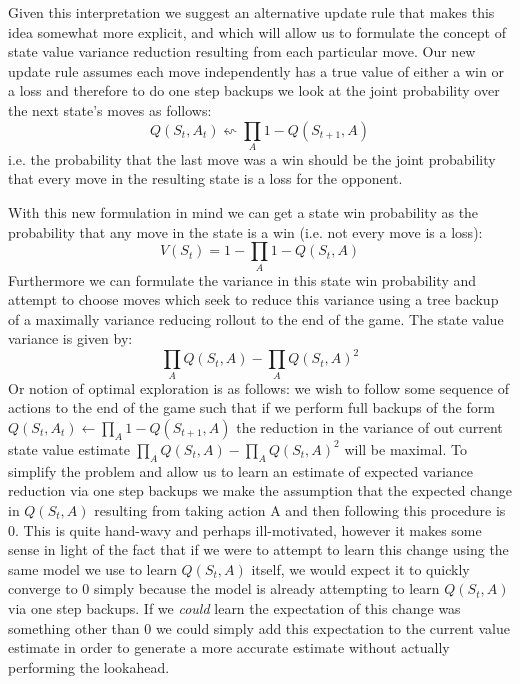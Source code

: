 \documentclass{article}
\begin{document}
Given this interpretation we suggest an alternative update rule that makes this idea somewhat more explicit, and which will allow us to formulate the concept of state value variance reduction resulting from each particular move. Our new update rule assumes each move independently has a true value of either a win or a loss and therefore to do one step backups we look at the joint probability over the next state's moves as follows:
$$Q(S_t,A_t)\leftsquigarrow \prod_A 1-Q(S_{t+1},A)$$
i.e. the probability that the last move was a win should be the joint probability that every move in the resulting state is a loss for the opponent.

With this new formulation in mind we can get a state win probability as the probability that any move in the state is a win (i.e. not every move is a loss):
$$V(S_t)=1-\prod_A 1-Q(S_t,A)$$
Furthermore we can formulate the variance in this state win probability and attempt to choose moves which seek to reduce this variance using a tree backup of a maximally variance reducing rollout to the end of the game. The state value variance is given by:
$$\prod_A Q(S_t,A)-\prod_A Q(S_t,A)^2$$
Or notion of optimal exploration is as follows: we wish to follow some sequence of actions to the end of the game such that if we perform full backups of the form $Q(S_t,A_t)\leftarrow \prod_A 1-Q(S_{t+1},A)$ the reduction in the variance of out current state value estimate $\prod_A Q(S_t,A)-\prod_A Q(S_t,A)^2$ will be maximal. To simplify the problem and allow us to learn an estimate of expected variance reduction via one step backups we make the assumption that the expected change in $Q(S_t,A)$ resulting from taking action A and then following this procedure is 0. This is quite hand-wavy and perhaps ill-motivated, however it makes some sense in light of the fact that if we were to attempt to learn this change using the same model we use to learn $Q(S_t,A)$ itself, we would expect it to quickly converge to 0 simply because the model is already attempting to learn $Q(S_t,A)$ via one step backups. If we \textit{could} learn the expectation of this change was something other than 0 we could simply add this expectation to the current value estimate in order to generate a more accurate estimate without actually performing the lookahead.
\end{document}

